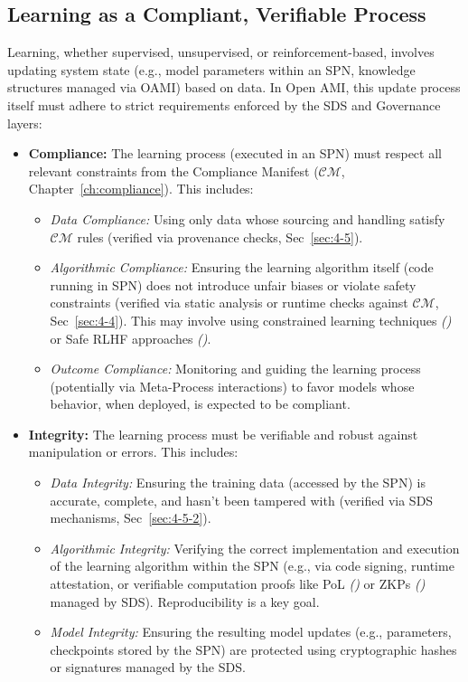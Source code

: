 \documentclass[12pt,a4paper]{report}
\renewcommand{\citep}[1]{\textit{\scriptsize{(\cite{#1})}}}
\begin{document}
	\subsection{Learning as a Compliant, Verifiable Process}
	\label{sec:2-5-1-new}
	
	Learning, whether supervised, unsupervised, or reinforcement-based, involves updating system state (e.g., model parameters within an SPN, knowledge structures managed via OAMI) based on data. In Open AMI, this update process itself must adhere to strict requirements enforced by the SDS and Governance layers:
	
	\begin{itemize}
		\item \textbf{Compliance:} The learning process (executed in an SPN) must respect all relevant constraints from the Compliance Manifest ($\mathcal{CM}$, Chapter~\ref{ch:compliance}). This includes:
		\begin{itemize}
			\item \textit{Data Compliance:} Using only data whose sourcing and handling satisfy $\mathcal{CM}$ rules (verified via provenance checks, Sec~\ref{sec:4-5}).
			\item \textit{Algorithmic Compliance:} Ensuring the learning algorithm itself (code running in SPN) does not introduce unfair biases or violate safety constraints (verified via static analysis or runtime checks against $\mathcal{CM}$, Sec~\ref{sec:4-4}). This may involve using constrained learning techniques \citep{Constraint_RL_Survey_2024} or Safe RLHF approaches \citep{Dai_Safe_RLHF_2023}.
			\item \textit{Outcome Compliance:} Monitoring and guiding the learning process (potentially via Meta-Process interactions) to favor models whose behavior, when deployed, is expected to be compliant.
		\end{itemize}
		\item \textbf{Integrity:} The learning process must be verifiable and robust against manipulation or errors. This includes:
		\begin{itemize}
			\item \textit{Data Integrity:} Ensuring the training data (accessed by the SPN) is accurate, complete, and hasn't been tampered with (verified via SDS mechanisms, Sec~\ref{sec:4-5-2}).
			\item \textit{Algorithmic Integrity:} Verifying the correct implementation and execution of the learning algorithm within the SPN (e.g., via code signing, runtime attestation, or verifiable computation proofs like PoL \citep{Jia2021ProofOfLearning} or ZKPs \citep{Peng2025ZKMLSurvey} managed by SDS). Reproducibility is a key goal.
			\item \textit{Model Integrity:} Ensuring the resulting model updates (e.g., parameters, checkpoints stored by the SPN) are protected using cryptographic hashes or signatures managed by the SDS.
		\end{itemize}
	\end{itemize}
	
\end{document}
